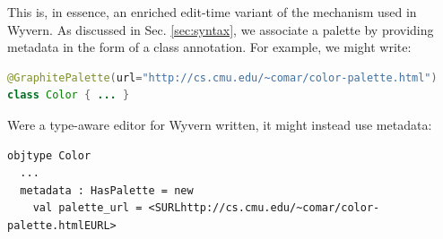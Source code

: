 \begin{contribution}
This is, in essence, an enriched edit-time variant of the mechanism used in Wyvern. As discussed in Sec. \ref{sec:syntax}, we associate a palette by providing metadata in the form of a class annotation. For example, we might write:
\begin{lstlisting}[language=Java]
@GraphitePalette(url="http://cs.cmu.edu/~comar/color-palette.html")
class Color { ... }
\end{lstlisting}

Were a type-aware editor for Wyvern written, it might instead use metadata:
\begin{lstlisting}
objtype Color
  ...
  metadata : HasPalette = new
    val palette_url = <SURLhttp://cs.cmu.edu/~comar/color-palette.htmlEURL>
\end{lstlisting}
\end{contribution}


